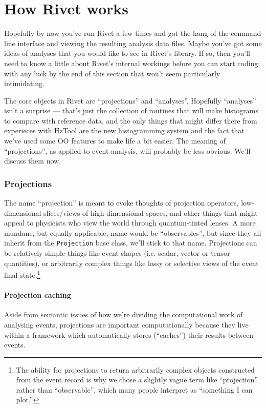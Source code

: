 \documentclass{JHEP3}
\newcommand{\kbd}[1]{\texttt{#1}\xspace}
\begin{document}
\clearpage
\part{How Rivet works}
\label{part:writinganalyses}

Hopefully by now you've run Rivet a few times and got the hang of the command
line interface and viewing the resulting analysis data files. Maybe you've got
some ideas of analyses that you would like to see in Rivet's library. If so,
then you'll need to know a little about Rivet's internal workings before you can
start coding: with any luck by the end of this section that won't seem
particularly intimidating.

The core objects in Rivet are ``projections'' and ``analyses''. Hopefully
``analyses'' isn't a surprise --- that's just the collection of routines that
will make histograms to compare with reference data, and the only things that
might differ there from experieces with HzTool are the new histogramming system
and the fact that we've used some OO features to make life a bit easier. The
meaning of ``projections'', as applied to event analysis, will probably be less
obvious. We'll discuss them now.


\section{Projections}
The name ``projection'' is meant to evoke thoughts of
projection operators, low-dimensional slices/views of high-dimensional spaces,
and other things that might appeal to physicists who view the world through
quantum-tinted lenses. A more mundane, but equally applicable, name would be
``observables'', but since they all inherit from the \kbd{Projection} base
class, we'll stick to that name. Projections can be relatively simple things
like event shapes (i.e. scalar, vector or tensor quantities), or arbitrarily
complex things like lossy or selective views of the event final
state.\footnote{The ability for projections to return arbitrarily complex objects
  constructed from the event record is why we chose a slightly vague term like
  ``projection'' rather than ``observable'', which many people interpret as
  ``something I can plot.''}

\subsection{Projection caching}
Aside from semantic issues of how we're dividing the computational work of
analysing events, projections are important computationally because they live
within a framework which automatically stores (``caches'') their results between
events.
\end{document}
